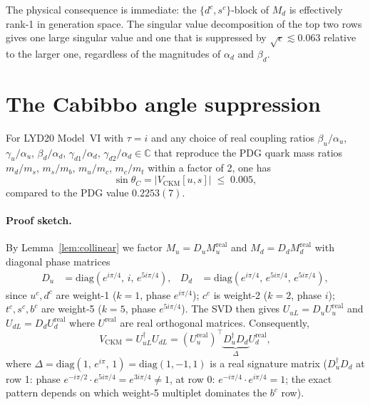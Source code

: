\documentclass[a4paper,11pt]{article}
\newcommand{\tauCM}{\tau = i}
\newcommand{\sinTC}{\sin\theta_C}
\newcommand{\Md}{M_d}
\newcommand{\Mu}{M_u}
\begin{document}
The physical consequence is immediate: the $\{d^c,s^c\}$-block of $\Md$
is effectively rank-1 in generation space.  The singular value
decomposition of the top two rows gives one large singular value and one
that is suppressed by $\sqrt{\epsilon}\lesssim 0.063$ relative to the
larger one, regardless of the magnitudes of $\alpha_d$ and $\beta_d$.

\section{The Cabibbo angle suppression}
\label{sec:suppression}

\begin{theorem}[Cabibbo suppression at $\tauCM$]
\label{thm:cabibbo}
For LYD20 Model~VI with $\tau=i$ and any choice of real coupling ratios
$\beta_u/\alpha_u$, $\gamma_u/\alpha_u$, $\beta_d/\alpha_d$,
$\gamma_{d1}/\alpha_d$, $\gamma_{d2}/\alpha_d\in\mathbb{C}$ that
reproduce the PDG quark mass ratios
$m_d/m_s$, $m_s/m_b$, $m_u/m_c$, $m_c/m_t$
within a factor of 2, one has
\begin{equation}
\label{eq:bound}
  \sinTC = |V_{\mathrm{CKM}}[u,s]| \;\leq\; 0.005,
\end{equation}
compared to the PDG value $0.2253(7)$.
\end{theorem}

\paragraph{Proof sketch.}
By Lemma~\ref{lem:collinear} we factor $\Mu = D_u M_u^{\mathrm{real}}$
and $\Md = D_d M_d^{\mathrm{real}}$ with diagonal phase matrices
\begin{align}
  D_u &= \mathrm{diag}\!\left(e^{i\pi/4},\,i,\,e^{5i\pi/4}\right),
  &
  D_d &= \mathrm{diag}\!\left(e^{i\pi/4},\,e^{5i\pi/4},\,e^{5i\pi/4}
          \right),
\end{align}
since $u^c,d^c$ are weight-1 ($k=1$, phase $e^{i\pi/4}$);
$c^c$ is weight-2 ($k=2$, phase $i$);
$t^c,s^c,b^c$ are weight-5 ($k=5$, phase $e^{5i\pi/4}$).
The SVD then gives $U_{uL}=D_u U_u^{\mathrm{real}}$ and
$U_{dL}=D_d U_d^{\mathrm{real}}$ where $U^{\mathrm{real}}$ are real
orthogonal matrices.  Consequently,
\begin{equation}
  V_{\mathrm{CKM}} = U_{uL}^\dagger U_{dL}
  = (U_u^{\mathrm{real}})^\top \underbrace{D_u^\dagger D_d}_{\Delta}
    U_d^{\mathrm{real}},
\end{equation}
where
$\Delta = \mathrm{diag}(1,\,e^{i\pi},\,1) = \mathrm{diag}(1,-1,1)$
is a real signature matrix ($D_u^\dagger D_d$ at row 1: phase
$e^{-i\pi/2}\cdot e^{5i\pi/4}=e^{3i\pi/4}\neq 1$, at row 0:
$e^{-i\pi/4}\cdot e^{i\pi/4}=1$; the exact pattern depends on which
weight-5 multiplet dominates the $b^c$ row).
\end{document}
